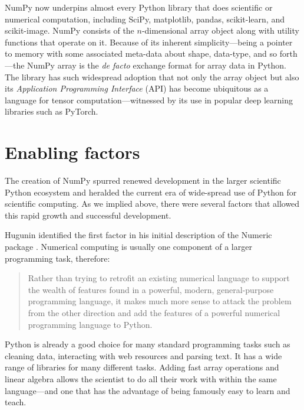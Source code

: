 NumPy now underpins almost every Python library that does scientific or
numerical computation, including SciPy\cite{virtanen2019scipy},
matplotlib\cite{hunter2007matplotlib}, pandas\cite{mckinney-proc-scipy-2010},
scikit-learn\cite{pedregosa2011scikit}, and
scikit-image\cite{vanderwalt2014scikit}.
NumPy consists of the $n$-dimensional array object along with utility functions
that operate on it.
Because of its inherent simplicity---being a pointer to memory with some
associated meta-data about shape, data-type, and so forth---the NumPy array is
the {\it de facto} exchange format for array data in Python.
The library has such widespread adoption that not only the array object but also its
{\it Application Programming Interface} (API) has become ubiquitous as
a language for tensor computation---witnessed by its use in popular
deep learning libraries such as PyTorch\cite{pytorch}.

\section*{Enabling factors}

The creation of NumPy spurred renewed development in the larger scientific
Python ecosystem and heralded the current era of wide-spread use of Python for
scientific computing.
As we implied above, there were several factors that allowed this rapid growth
and successful development.

Hugunin identified the first factor in his initial description of the Numeric
package \cite{Hugunin-whitepaper}.  Numerical computing is usually one
component of a larger programming task, therefore:

\begin{quote}
    Rather than trying to retrofit an existing numerical language to support
    the wealth of features found in a powerful, modern, general-purpose
    programming language, it makes much more sense to attack the problem from
    the other direction and add the features of a powerful numerical
    programming language to Python.
\end{quote}

Python is already a good choice for many standard programming tasks such as
cleaning data, interacting with web resources and parsing text.  It has a wide
range of libraries for many different tasks. Adding fast array operations and
linear algebra allows the scientist to do all their work with within the same
language---and one that has the advantage of being famously easy to learn and
teach.

